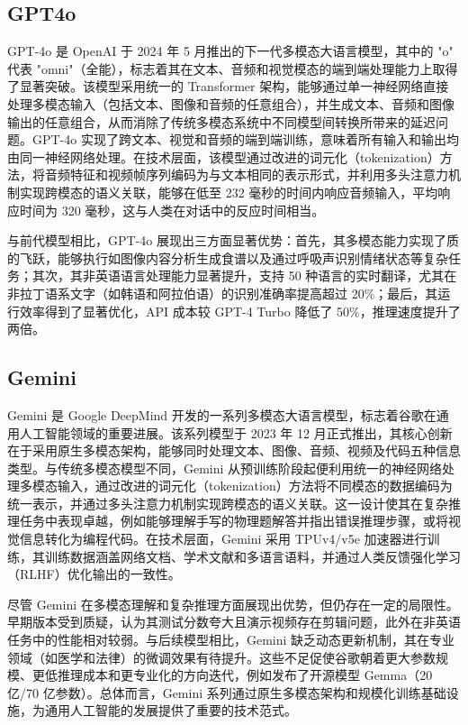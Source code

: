 \subsection{GPT4o}
\label{sec:TOSWT-gen-gpt4o}

GPT-4o \cite{gpt4o} 是 OpenAI 于 2024 年 5 月推出的下一代多模态大语言模型，其中的 "o" 代表 "omni"（全能），标志着其在文本、音频和视觉模态的端到端处理能力上取得了显著突破。该模型采用统一的 Transformer 架构，能够通过单一神经网络直接处理多模态输入（包括文本、图像和音频的任意组合），并生成文本、音频和图像输出的任意组合，从而消除了传统多模态系统中不同模型间转换所带来的延迟问题。GPT-4o 实现了跨文本、视觉和音频的端到端训练，意味着所有输入和输出均由同一神经网络处理。在技术层面，该模型通过改进的词元化（tokenization）方法，将音频特征和视频帧序列编码为与文本相同的表示形式，并利用多头注意力机制实现跨模态的语义关联，能够在低至 232 毫秒的时间内响应音频输入，平均响应时间为 320 毫秒，这与人类在对话中的反应时间相当。

与前代模型相比，GPT-4o 展现出三方面显著优势：首先，其多模态能力实现了质的飞跃，能够执行如图像内容分析生成食谱以及通过呼吸声识别情绪状态等复杂任务；其次，其非英语语言处理能力显著提升，支持 50 种语言的实时翻译，尤其在非拉丁语系文字（如韩语和阿拉伯语）的识别准确率提高超过 20\%；最后，其运行效率得到了显著优化，API 成本较 GPT-4 Turbo 降低了 50\%，推理速度提升了两倍。

\subsection{Gemini}
\label{sec:TOSWT-gen-gemini}

Gemini \cite{geminiteam2024geminifamilyhighlycapable} 是 Google DeepMind 开发的一系列多模态大语言模型，标志着谷歌在通用人工智能领域的重要进展。该系列模型于 2023 年 12 月正式推出，其核心创新在于采用原生多模态架构，能够同时处理文本、图像、音频、视频及代码五种信息类型。与传统多模态模型不同，Gemini 从预训练阶段起便利用统一的神经网络处理多模态输入，通过改进的词元化（tokenization）方法将不同模态的数据编码为统一表示，并通过多头注意力机制实现跨模态的语义关联。这一设计使其在复杂推理任务中表现卓越，例如能够理解手写的物理题解答并指出错误推理步骤，或将视觉信息转化为编程代码。在技术层面，Gemini 采用 TPUv4/v5e 加速器进行训练，其训练数据涵盖网络文档、学术文献和多语言语料，并通过人类反馈强化学习 \cite{kaufmann2024surveyreinforcementlearninghuman} （RLHF）优化输出的一致性。

尽管 Gemini 在多模态理解和复杂推理方面展现出优势，但仍存在一定的局限性。早期版本受到质疑，认为其测试分数夸大且演示视频存在剪辑问题，此外在非英语任务中的性能相对较弱。与后续模型相比，Gemini 缺乏动态更新机制，其在专业领域（如医学和法律）的微调效果有待提升。这些不足促使谷歌朝着更大参数规模、更低推理成本和更专业化的方向迭代，例如发布了开源模型 Gemma（20 亿/70 亿参数）。总体而言，Gemini 系列通过原生多模态架构和规模化训练基础设施，为通用人工智能的发展提供了重要的技术范式。

